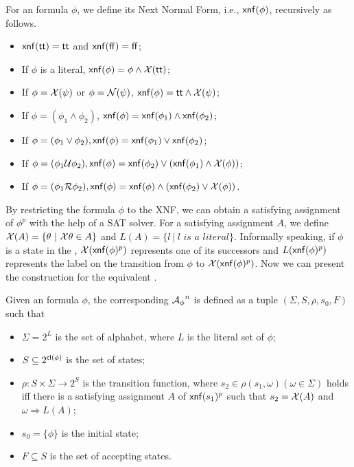 \begin{definition}\label{def:xnf}
For an \ltlf formula $\phi$, we define its Next Normal Form, i.e., ${\sf xnf}(\phi)$, recursively as follows. 
\begin{itemize}
\item ${\sf xnf}({\sf tt}) = {\sf tt}$ and ${\sf xnf}({\sf ff}) = {\sf ff}$;
\item If $\phi$ is a literal, ${\sf xnf}(\phi) = \phi \wedge \mathcal{X}({\sf tt})$;
\item If $\phi = \mathcal{X}(\psi)$ or $\phi = \mathcal{N}(\psi)$, ${\sf xnf}(\phi) = {\sf tt} \wedge \mathcal{X}(\psi)$;
\item If $\phi = (\phi_1 \wedge \phi_2)$, ${\sf xnf}(\phi) = {\sf xnf}(\phi_1)\wedge{\sf xnf}(\phi_2)$;
\item If $\phi = (\phi_1 \vee \phi_2), {\sf xnf}(\phi) = {\sf xnf}(\phi_1)\vee {\sf xnf}(\phi_2)$; 
\item If $\phi = (\phi_1 \mathcal{U} \phi_2), {\sf xnf}(\phi) = {\sf xnf}(\phi_2) \vee ({\sf xnf}(\phi_1) \wedge \mathcal{X}(\phi))$; 
\item If $\phi = (\phi_1 \mathcal{R} \phi_2), {\sf xnf}(\phi) = {\sf xnf}(\phi)\wedge ({\sf xnf}(\phi_2) \vee \mathcal{X}(\phi))$.
\end{itemize}
\end{definition}

By restricting the \ltlf formula $\phi$ to the XNF, we can obtain a satisfying assignment of $\phi^{p}$ with the help of a SAT solver.
For a satisfying assignment $A$, we define $\mathcal{X}(A)=\{\theta\ |\ \mathcal{X}\theta\in A\}$ and $L(A) =\{l\ |\ l \textit{ is a literal}\}$. Informally speaking, if $\phi$ is a state in the \NFA, $\mathcal{X}({\sf xnf}(\phi)^p)$ represents one of its successors and $L({\sf xnf}(\phi)^p)$ represents the label on the transition from $\phi$ to $\mathcal{X}({\sf xnf}(\phi)^p)$. Now we can present the construction for the equivalent \NFA. 
\iffalse
\begin{definition}[Accepting State] 
For an \ltlf formula $\phi$ and $s$ being a state of the transition system $T_{\phi}$. $s$ is an accepting state iff there exists a transition $s \overset{\alpha}{\rightarrow}s$ in $T_{\phi}$ such that $\alpha \models s$ holds. 
\end{definition}
\fi
   
\begin{definition}\label{def:ltlf2nfa} 
Given an \ltlf formula $\phi$, the corresponding \NFA ${\mathcal{A}_{\phi}}^n$ is defined as a tuple $(\Sigma, S, \rho, s_0, F)$ such that
\begin{itemize}
	\item $\Sigma = 2^{L}$ is the set of alphabet, where $L$ is the literal set of $\phi$;
	\item $S\subseteq 2^{{\sf cl}(\phi)}$ is the set of states;
	\item $\rho:  S \times \Sigma \to 2^S$ is the transition function, where $s_2 \in \rho(s_1, \omega) (\omega \in \Sigma)$ holds iff there is a satisfying assignment $A$ of ${\sf xnf}(s_1)^p$ such that $s_2 = \mathcal{X}(A)$ and $\omega\Rightarrow L(A)$;
	\item $s_0 = \{\phi \}$ is the initial state;
	\item $F\subseteq S$ is the set of accepting states. 
\end{itemize}
\end{definition}


